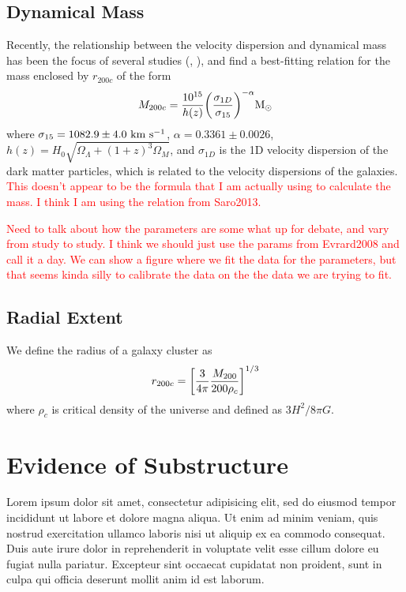 \documentclass[apj, revtex4]{emulateapj}
\newcommand{\editorial}[1]{\textcolor{red}{#1} }
\begin{document}
\subsection{Dynamical Mass}
Recently, the relationship between the velocity dispersion and dynamical mass has been the focus of several studies (\eg, \citealt{Evrard2008, Saro2013, Sifon2013, VanderBurg2014}), and find a best-fitting relation for the mass enclosed by $r_{200c}$ of the form
\begin{equation}
	M_{200c} = \frac{10^{15}}{h(z)} \bigg{(}\frac{\sigma_{1D}}{\sigma_{15}} \bigg{)}^{-\alpha} \hbox{$\mathrm{M}_\odot$}
\end{equation}
where $\sigma_{15} = 1082.9 \pm 4.0~\hbox{km~s$^{-1}$}$, $\alpha = 0.3361 \pm 0.0026$, $h(z) = H_0 \sqrt{\Omega_\Lambda + (1+z)^3 \Omega_M}$, and $\sigma_{1D}$ is the 1D velocity dispersion of the dark matter particles, which is related to the velocity dispersions of the galaxies. \editorial{This doesn't appear to be the formula that I am actually using to calculate the mass. I think I am using the relation from Saro2013.}

\editorial{Need to talk about how the parameters are some what up for debate, and vary from study to study. I think we should just use the params from Evrard2008 and call it a day. We can show a figure where we fit the data for the parameters, but that seems kinda silly to calibrate the data on the the data we are trying to fit.}

\subsection{Radial Extent}
We define the radius of a galaxy cluster as
\begin{equation}
	r_{200c} = \bigg{[} \frac{3}{4\pi} \frac{M_{200}}{200\rho_c} \bigg{]}^{1/3}
\end{equation}
where $\rho_c$ is critical density of the universe and defined as $3H^2/8\pi G$.


\section{Evidence of Substructure}
Lorem ipsum dolor sit amet, consectetur adipisicing elit, sed do eiusmod tempor incididunt ut labore et dolore magna aliqua. Ut enim ad minim veniam, quis nostrud exercitation ullamco laboris nisi ut aliquip ex ea commodo consequat. Duis aute irure dolor in reprehenderit in voluptate velit esse cillum dolore eu fugiat nulla pariatur. Excepteur sint occaecat cupidatat non proident, sunt in culpa qui officia deserunt mollit anim id est laborum.
\end{document}
